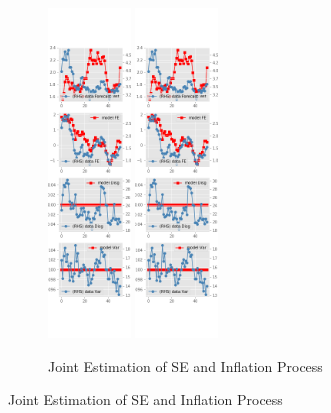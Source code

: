 \documentclass[]{article}
\begin{document}
\begin{figure}[ht]
\begin{subfigure}[b]{\textwidth}
		\centering
		\caption{Joint Estimation of SE and Inflation Process}
		\label{SE_diag_joint_SCE}
		\includegraphics[width=0.24\textwidth]{figures/sce_se_est_joint_diag0.png}
		\includegraphics[width=0.24\textwidth]{figures/sce_se_est_joint_diag1.png}

\end{subfigure}
\end{figure}
\end{document}

